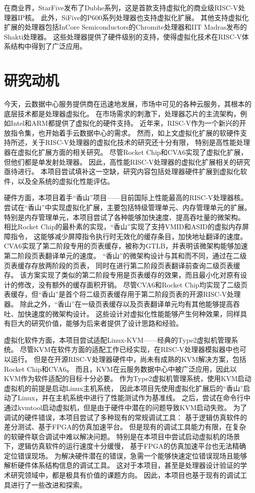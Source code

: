 在商业界，StarFive发布了Dubhe系列，这是首款支持虚拟化的商业级RISC-V处理器IP核。
此外，SiFive的P600系列处理器也支持虚拟化扩展。
其他支持虚拟化扩展的处理器包括InCore Semiconductors的Chromite处理器和IIT Madras发布的Shakti处理器。
这些处理器提供了硬件级别的支持，使得虚拟化技术在RISC-V体系结构中得到了广泛应用。

\section{研究动机}

今天，云数据中心服务提供商在迅速地发展，市场中可见的各种云服务，其根本的底层技术都是处理器虚拟化。
在市场需求的刺激下，处理器芯片的主流架构，例如Intel和ARM都提供了虚拟化的硬件支持。
近年来，RISC-V作为一个新兴的开放指令集，也开始着手云数据中心的需求。
然而，如上文虚拟化扩展的软硬件支持所述，关于RISC-V处理器的虚拟化技术的研究还十分有限，
特别是高性能处理器在虚拟化扩展方面的相关研究。
尽管Rocket Chip和CVA6实现了虚拟化扩展，但他们都是单发射处理器。
因此，高性能RISC-V处理器的虚拟化扩展相关的研究亟待进行。
本项目尝试填补这一空缺，研究内容包括处理器硬件扩展到虚拟化软件，以及全系统的虚拟化性能评估。

硬件方面，本项目着手“香山”项目——目前国际上性能最高的RISC-V处理器核。
尝试在“香山”中实现虚拟化扩展，主要包括特级管理单元、内存管理单元的扩展。
特别是内存管理单元，本项目尝试了各种能够加快速度、提高吞吐量的微架构。
相比Rocket Chip的最朴素的实现，“香山”实现了支持VMID和ASID的虚拟内存屏障指令，
这能够减少屏障指令执行时无效化的缓存条目，加快地址翻译的速度。
CVA6实现了第二阶段专用的页表缓存，被称为GTLB，并表明该微架构能够加速第二阶段页表翻译单元的速度。
“香山”的微架构设计与其和而不同，通过在二级页表缓存存放两阶段的页表，
同时在进行第二阶段页表翻译前查询二级页表缓存。
该方案实现了类似的第二阶段专用是页表缓存的效果，而且最小化对原有设计的修改，没有额外的缓存面积开销。
尽管CVA6和Rocket Chip均实现了二级页表缓存，但“香山”是首个将二级页表缓存用于第二阶段页表的开源RISC-V处理器。
除此之外，“香山”在一级页表缓存以及页表翻译单元均有其他能够提高吞吐、加快速度的微架构设计。
这些设计对虚拟化性能能够产生何种效果，同样具有巨大的研究价值，能够为后来者提供了设计思路和经验。

虚拟化软件方面，本项目尝试适配Linux-KVM——经典的Type2虚拟机管理系统。
尽管KVM在软件方面的适配工作已经实现，在RISC-V处理器模拟器中也可以运行。
但是在开源RISC-V处理器硬件中，尚未有成熟的KVM解决方案，包括Rocket Chip和CVA6。
而且，KVM在云服务数据中心中被广泛应用，因此以KVM作为软件适配的目标十分必要。
作为Type2虚拟机管理系统，使用KVM启动虚拟机的前提是启动Linux主机系统，
因此本项目先使用虚拟化扩展后的“香山”启动了Linux，并在主机系统中进行了性能测试作为基准线。
之后，尝试在命令行中通过kvmtool启动虚拟机，但是由于硬件中潜在的问题导致KVM启动失败。
为了调试的硬件错误，本项目尝试了多种现有的常规调试工具：
基于逻辑仿真软件的差分测试、基于FPGA的仿真加速平台。
但是现有的调试工具能力有限，在复杂的软硬件联合调试中难以解决问题。
特别是在本项目中尝试启动虚拟机的场景下，逻辑仿真软件的运行速度十分缓慢，
基于FPGA的仿真加速平台也无法精确定位错误现场。
为解决硬件潜在的错误，急需一个能够快速定位错误现场且能够解析硬件体系结构信息的调试工具。
这对于本项目，甚至是处理器设计验证的学术研究领域中，都是极具有价值的课题方向。
因此，本项目也基于现有的调试工具进行了一些改进和探索。